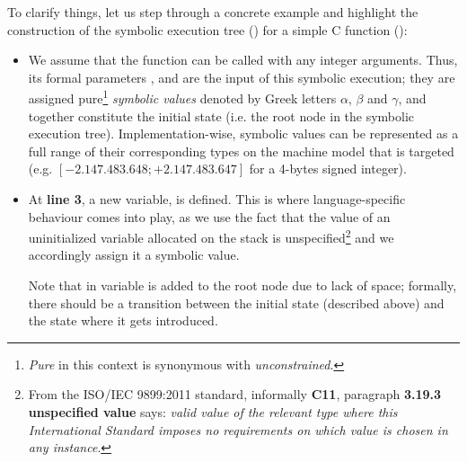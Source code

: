 To clarify things, let us step through a concrete example and highlight the
construction of the symbolic execution tree
() for a simple C function
():
\begin{itemize}
  \newcommand{\pa}{\hltexttt{a}}
  \newcommand{\pb}{\hltexttt{b}}
  \newcommand{\pc}{\hltexttt{c}}
  \newcommand{\vmax}{\hltexttt{max}}

  \item We assume that the  function can be called with any
    integer arguments.  Thus, its formal parameters \pa{}, \pb{} and \pc{} are
    the input of this symbolic execution; they are assigned
    pure\footnote{\emph{Pure} in this context is synonymous with
    \emph{unconstrained}.} \emph{symbolic values} denoted by Greek letters
    $\alpha$, $\beta$ and $\gamma$, and together constitute the initial state
    (i.e. the root node in the symbolic execution tree).  Implementation-wise,
    symbolic values can be represented as a full range of their corresponding
    types on the machine model that is targeted (e.g. $[-2.147.483.648;
    +2.147.483.647]$ for a 4-bytes signed integer).

  \item At \textbf{line 3}, a new variable, \vmax{} is defined.  This is where
    language-specific behaviour comes into play, as we use the fact that the
    value of an uninitialized variable allocated on the stack is
    unspecified\footnote{From the ISO/IEC 9899:2011 standard, informally
    \textbf{C11}, paragraph \textbf{3.19.3 unspecified value} says: \emph{valid
    value of the relevant type where this International Standard imposes no
    requirements on which value is chosen in any instance}.} and we accordingly
    assign it a symbolic value.

    Note that in  variable \vmax{} is
    added to the root node due to lack of space; formally, there should be a
    transition between the initial state (described above) and the state where
    it gets introduced.


\end{itemize}
